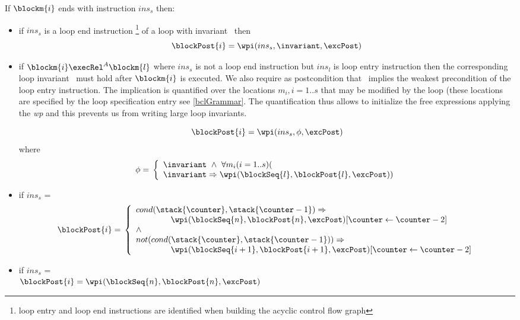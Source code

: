 \begin{defn}\label{post}
 If $\blockm{i}$ ends with instruction $ins_s$ then:
 \begin{itemize} 

\item if  $ins_s$ is a loop end instruction \footnote{loop entry and loop end instructions are identified when building the acyclic control flow graph} of a loop with invariant \invariant \ then 
$$
\blockPost{i} =  \wpi( ins_s, \invariant, \excPost ) 
$$

\item if $\blockm{i} \execRel^A \blockm{l}$ where $ins_s$ is not a loop end instruction but $ins_l$ is loop entry instruction then the corresponding loop invariant \invariant \ must hold after $\blockm{i}$ is executed. We also require as postcondition that \invariant \ implies the weakest precondition of the loop entry instruction. The implication is quantified over the locations $m_i , i= 1..s$ that may be modified by the loop (these locations are specified by the  loop specification entry  see \ref{bclGrammar}. The quantification thus allows to initialize the free expressions applying the \textit{wp} and this prevents us from writing large loop invariants.

$$
\blockPost{i} = \wpi(ins_s, \phi, \excPost) \\
$$
where \\
$$
\phi = \\
\left\{
\begin{array}{l}
\invariant \ \wedge \ \forall m_i (i = 1..s ) (\\
\invariant \Rightarrow \wpi(\blockSeq{l},\blockPost{l},\excPost))
\end{array}
\right.
$$
  
 \item if  $ins_s$ =   \\
$$
\blockPost{i} =  \\
\left\{
\begin{array}{l}
cond( \stack{\counter}, \stack{\counter - 1} )   \Rightarrow \\
\phantom{ \counter }   \wpi(\blockSeq{n}, \blockPost{n} ,\excPost )[ \counter \leftarrow \counter -2 ]  \\
\wedge \\
 not ( cond( \stack{\counter}, \stack{\counter - 1} )  )   \Rightarrow \\
\phantom{ \counter}    \wpi(\blockSeq{i+1}, \blockPost{i+1},\excPost ) [ \counter \leftarrow \counter -2 ]      \\                             
\end{array}
\right.
$$
\item if  $ins_s$ =   \\ 
$\blockPost{i} =  \wpi(\blockSeq{n}, \blockPost{n} , \excPost )$ \\


\end{itemize}
\end{defn}
